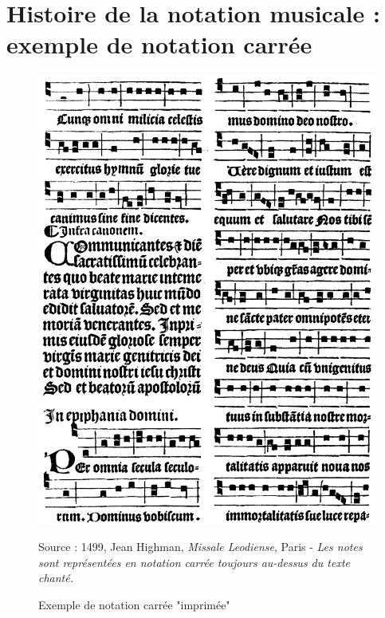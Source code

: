 \section{Histoire de la notation musicale : exemple de notation carrée}
\label{sec:exempleNotationCarree}
\begin{figure}[H]
	\centering
	\includegraphics[keepaspectratio=true, width=\textwidth]{Annexes/i/notationCarree.jpg}
	\caption{Exemple de notation carrée "imprimée"}
	\medskip
	\small
	Source : 1499, Jean Highman, \textit{Missale Leodiense}, Paris - \textit{Les notes sont représentées en notation carrée toujours au-dessus du texte chanté.}
	\label{fig:notationCarree}
\end{figure}



